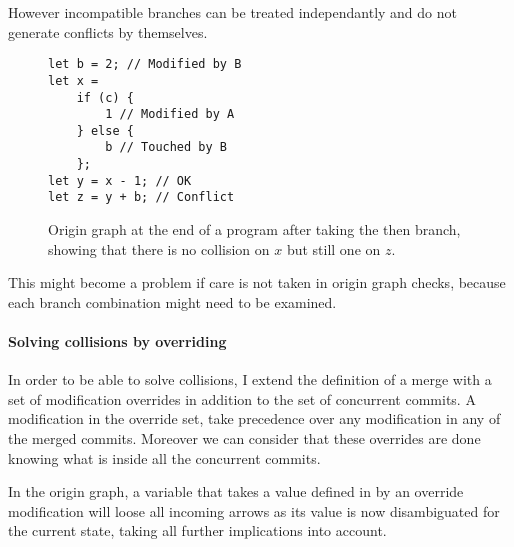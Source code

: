 \documentclass[a4paper,10pt]{article}
\begin{document}
However incompatible branches can be treated independantly and do not generate conflicts by themselves.

\begin{figure}[ht]
\begin{minipage}{.5\textwidth}
\begin{lstlisting}
let b = 2; // Modified by B
let x =
    if (c) {
        1 // Modified by A
    } else {
        b // Touched by B
    };
let y = x - 1; // OK
let z = y + b; // Conflict
\end{lstlisting}
\end{minipage}\hfill
\begin{minipage}{.45\textwidth}
\centering{}
\end{minipage}
\caption{Origin graph at the end of a program after taking the then branch, showing that there is no collision on $x$ but still one on $z$.}
\label{fig:origin_graph_branches}
\end{figure}

This might become a problem if care is not taken in origin graph checks, because each branch combination might need to be examined.

\paragraph{Solving collisions by overriding}
In order to be able to solve collisions, I extend the definition of a merge with a set of modification overrides in addition to the set of concurrent commits.
A modification in the override set, take precedence over any modification in any of the merged commits. Moreover we can consider that these overrides are done knowing what is inside all the concurrent commits.

In the origin graph, a variable that takes a value defined in by an override modification will loose all incoming arrows as its value is now disambiguated for the current state, taking all further implications into account.
\end{document}
